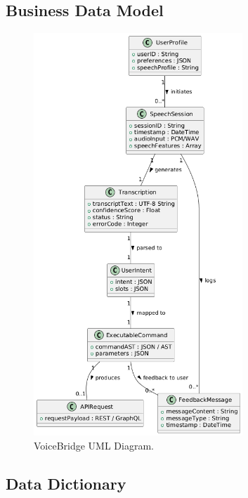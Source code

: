 \documentclass[11pt]{article}
\begin{document}
\subsection{Business Data Model}
\begin{figure}[H]
    \centering
    \includegraphics[width=0.7\textwidth]{..//imgs/VoiceBridge_uml.png}
    \caption{VoiceBridge UML Diagram. }
    \label{fig:voicebridge-usecase}
\end{figure} 

\subsection{Data Dictionary}
\end{document}
